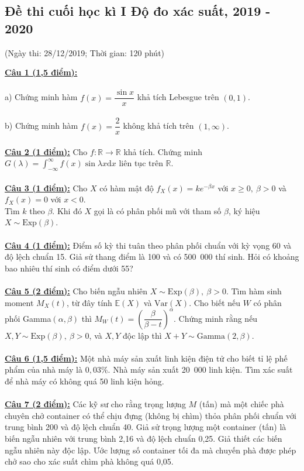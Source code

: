 \documentclass[10pt, a4paper]{article}
\begin{document}
\subsection{Đề thi cuối học kì I Độ đo xác suất, 2019 - 2020}
\begin{center}
	\color{blue}(Ngày thi: 28/12/2019; Thời gian: 120 phút)
\end{center}
\color{red}\underline{\textbf{Câu 1 (1,5 điểm):}}\\\\
\color{red}a) \color{black}Chứng minh hàm $f(x)=\dfrac{\sin x}{x}$ khả tích Lebesgue trên $(0,1)$.\\\\
\color{red}b) \color{black}Chứng minh hàm $f(x)=\dfrac2x$ không khả tích trên $(1,\infty)$.\\\\
\color{red}\underline{\textbf{Câu 2 (1 điểm):}} \color{black}Cho $f:\mathbb R\rightarrow\mathbb R$ khả tích. Chứng minh $G(\lambda)=\displaystyle\int_{-\infty}^\infty f(x)\sin\lambda x\text{d}x$ liên tục trên $\mathbb R$.\\\\
\color{red}\underline{\textbf{Câu 3 (1 điểm):}} \color{black}Cho $X$ có hàm mật độ $f_X(x)=ke^{-\beta x}$ với $x\ge0,~\beta>0$ và $f_X(x)=0$ với $x<0$.\\ Tìm $k$ theo $\beta$. Khi đó $X$ gọi là có phân phối mũ với tham số $\beta$, ký hiệu $X\sim\text{Exp}(\beta)$.\\\\
\color{red}\underline{\textbf{Câu 4 (1 điểm):}} \color{black}Điểm số kỳ thi tuân theo phân phối chuẩn với kỳ vọng 60 và độ lệch chuẩn 15. Giả sử thang điểm là 100 và có 500~000 thí sinh. Hỏi có khoảng bao nhiêu thí sinh có điểm dưới 55?\\\\
\color{red}\underline{\textbf{Câu 5 (2 điểm):}} \color{black}Cho biến ngẫu nhiên $X\sim\text{Exp}(\beta),~\beta>0$. Tìm hàm sinh moment $M_X(t)$, từ đây tính $\mathbb E(X)$ và $\text{Var}(X)$. Cho biết nếu $W$ có phân phối Gamma$(\alpha,\beta)$ thì $M_W(t)=\left(\dfrac{\beta}{\beta-t}\right)^\alpha$. Chứng minh rằng nếu $X,Y\sim\text{Exp}(\beta),~\beta>0$, và $X,Y$ độc lập thì $X+Y\sim\text{Gamma}(2,\beta)$.\\\\
\color{red}\underline{\textbf{Câu 6 (1,5 điểm):}} \color{black}Một nhà máy sản xuất linh kiện điện tử cho biết tỉ lệ phế phẩm của nhà máy là $0,03\%$. Nhà máy sản xuất 20~000 linh kiện. Tìm xác suất để nhà máy có không quá 50 linh kiện hỏng.\\\\
\color{red}\underline{\textbf{Câu 7 (2 điểm):}} \color{black}Các kỹ sư cho rằng trọng lượng $M$ (tấn) mà một chiếc phà chuyên chở container có thể chịu đựng (không bị chìm) thỏa phân phối chuẩn với trung bình 200 và độ lệch chuẩn 40. Giả sử trọng lượng một container (tấn) là biến ngẫu nhiên với trung bình 2,16 và độ lệch chuẩn 0,25. Giả thiết các biến ngẫu nhiên này độc lập. Ước lượng số container tối đa mà chuyến phà được phép chở sao cho xác suất chìm phà không quá 0,05.
\end{document}
